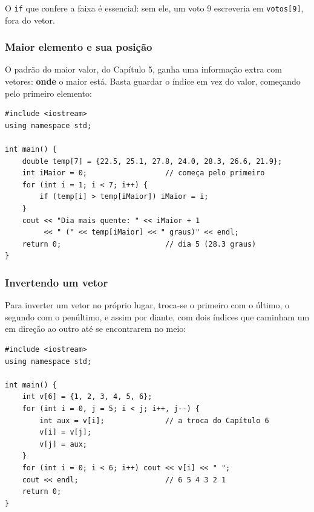 O \texttt{if} que confere a faixa é essencial: sem ele, um voto 9 escreveria em \texttt{votos[9]}, fora do vetor.

\subsubsection{Maior elemento e sua posição}

O padrão do maior valor, do Capítulo 5, ganha uma informação extra com vetores: \textbf{onde} o maior está. Basta guardar o índice em vez do valor, começando pelo primeiro elemento:

\begin{codigo}
\begin{Verbatim}[breaklines=true, breaksymbolleft={}, fontsize=\footnotesize]
#include <iostream>
using namespace std;

int main() {
    double temp[7] = {22.5, 25.1, 27.8, 24.0, 28.3, 26.6, 21.9};
    int iMaior = 0;                  // começa pelo primeiro
    for (int i = 1; i < 7; i++) {
        if (temp[i] > temp[iMaior]) iMaior = i;
    }
    cout << "Dia mais quente: " << iMaior + 1
         << " (" << temp[iMaior] << " graus)" << endl;
    return 0;                        // dia 5 (28.3 graus)
}
\end{Verbatim}
\end{codigo}

\subsubsection{Invertendo um vetor}

Para inverter um vetor no próprio lugar, troca-se o primeiro com o último, o segundo com o penúltimo, e assim por diante, com dois índices que caminham um em direção ao outro até se encontrarem no meio:

\begin{codigo}
\begin{Verbatim}[breaklines=true, breaksymbolleft={}, fontsize=\footnotesize]
#include <iostream>
using namespace std;

int main() {
    int v[6] = {1, 2, 3, 4, 5, 6};
    for (int i = 0, j = 5; i < j; i++, j--) {
        int aux = v[i];              // a troca do Capítulo 6
        v[i] = v[j];
        v[j] = aux;
    }
    for (int i = 0; i < 6; i++) cout << v[i] << " ";
    cout << endl;                    // 6 5 4 3 2 1
    return 0;
}
\end{Verbatim}
\end{codigo}

